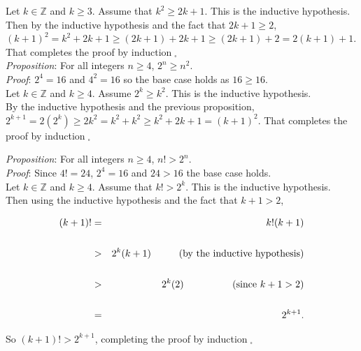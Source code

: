 \documentclass[12pt]{amsart}
\theoremstyle{definition}
\theoremstyle{remark}
\newcommand{\ints}{\mathbb Z}
\begin{document}
Let $k\in\ints$ and $k\geq 3$.  Assume that $k^2\geq 2k+1$.  This is the inductive hypothesis.\\

Then by the inductive hypothesis and the fact that $2k+1\geq 2$, \\ $(k+1)^2=k^2+2k+1\geq (2k+1)+2k+1\geq (2k+1)+2=2(k+1)+1$.  That completes the proof by induction$\;_{\square}$\\


\emph{Proposition}:  For all integers $n\geq 4$, $2^n\geq n^2$. \\

\emph{Proof}: $2^4=16$ and $4^2=16$ so the base case holds as $16\geq 16$.  \\

Let $k\in\ints$ and $k\geq 4$.  Assume $2^k\geq k^2$.  This is the inductive hypothesis.\\

By the inductive hypothesis and the previous proposition, \\ $2^{k+1}=2(2^k)\geq 2k^2=k^2+k^2\geq k^2+2k+1=(k+1)^2$.  That completes the proof by induction$\;_{\square}$



\newpage


\emph{Proposition}:  For all integers $n\geq 4$, $n!>2^n$.\\

\emph{Proof}:  Since $4!=24$, $2^4=16$ and $24>16$ the base case holds.\\

Let $k\in\ints$ and $k\geq 4$.  Assume that $k!>2^k$.  This is the inductive hypothesis.\\

Then using the inductive hypothesis and the fact that $k+1>2$,

\begin{eqnarray*}
(k+1)! &=& k! (k+1)\\
\\
&> & 2^k (k+1)\hspace{1cm} \mbox{(by the inductive hypothesis)}\\
\\
&>& 2^k (2)\hspace{1.75cm} (\mbox{since }k+1>2) \\
\\
&=& 2^{k+1}.\end{eqnarray*}

So $(k+1)!>2^{k+1}$, completing the proof by induction$\;_{\square}$\\
\end{document}
